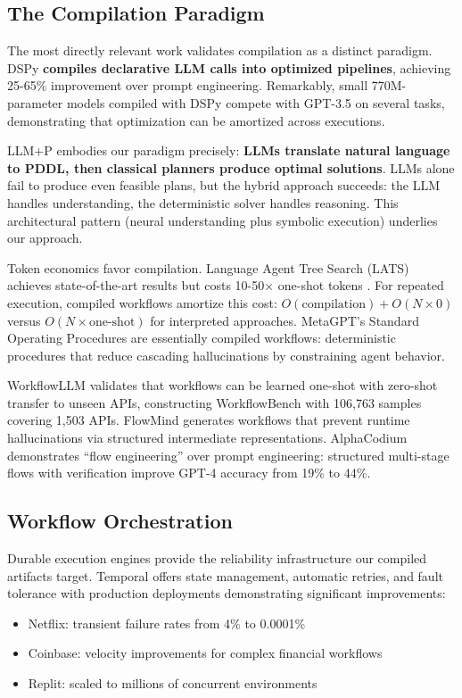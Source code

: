 \documentclass[11pt]{article}
\begin{document}
\subsection{The Compilation Paradigm}

The most directly relevant work validates compilation as a distinct paradigm. DSPy \citep{khattab2023dspy} \textbf{compiles declarative LLM calls into optimized pipelines}, achieving 25-65\% improvement over prompt engineering. Remarkably, small 770M-parameter models compiled with DSPy compete with GPT-3.5 on several tasks, demonstrating that optimization can be amortized across executions.

LLM+P \citep{liu2023llmp} embodies our paradigm precisely: \textbf{LLMs translate natural language to PDDL, then classical planners produce optimal solutions}. LLMs alone fail to produce even feasible plans, but the hybrid approach succeeds: the LLM handles understanding, the deterministic solver handles reasoning. This architectural pattern (neural understanding plus symbolic execution) underlies our approach.

Token economics favor compilation. Language Agent Tree Search (LATS) achieves state-of-the-art results but costs 10-50$\times$ one-shot tokens \citep{zhou2024lats}. For repeated execution, compiled workflows amortize this cost: $O(\text{compilation}) + O(N \times 0)$ versus $O(N \times \text{one-shot})$ for interpreted approaches. MetaGPT's Standard Operating Procedures \citep{hong2024metagpt} are essentially compiled workflows: deterministic procedures that reduce cascading hallucinations by constraining agent behavior.

WorkflowLLM \citep{fan2024workflowllm} validates that workflows can be learned one-shot with zero-shot transfer to unseen APIs, constructing WorkflowBench with 106,763 samples covering 1,503 APIs. FlowMind \citep{zeng2024flowmind} generates workflows that prevent runtime hallucinations via structured intermediate representations. AlphaCodium \citep{ridnik2024alphacodium} demonstrates ``flow engineering'' over prompt engineering: structured multi-stage flows with verification improve GPT-4 accuracy from 19\% to 44\%.

\subsection{Workflow Orchestration}

Durable execution engines provide the reliability infrastructure our compiled artifacts target. Temporal \citep{temporal2024} offers state management, automatic retries, and fault tolerance with production deployments demonstrating significant improvements:
\begin{itemize}
    \item Netflix: transient failure rates from 4\% to 0.0001\%
    \item Coinbase: velocity improvements for complex financial workflows
    \item Replit: scaled to millions of concurrent environments
\end{itemize}
\end{document}
